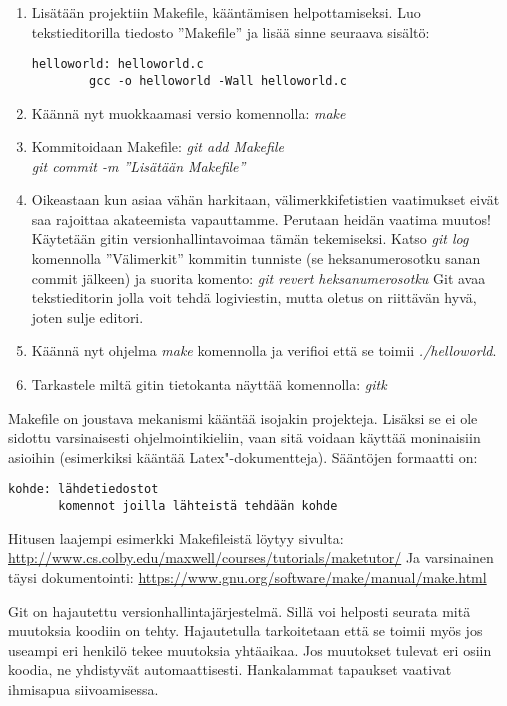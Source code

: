 \documentclass[12pt,portrait,a4]{article}
\begin{document}
\begin{enumerate}
\item Lisätään projektiin Makefile, kääntämisen helpottamiseksi.  Luo
tekstieditorilla tiedosto ''Makefile'' ja lisää sinne seuraava sisältö:
\begin{verbatim}
helloworld: helloworld.c
        gcc -o helloworld -Wall helloworld.c
\end{verbatim}
\item Käännä nyt muokkaamasi versio komennolla: \emph{make}

\item Kommitoidaan Makefile: \emph{git add Makefile}\\
\emph{git commit -m ''Lisätään Makefile''}

\item Oikeastaan kun asiaa vähän harkitaan, välimerkkifetistien vaatimukset
eivät saa rajoittaa akateemista vapauttamme.  Perutaan heidän vaatima
muutos!  Käytetään gitin versionhallintavoimaa tämän tekemiseksi.
Katso \emph{git log} komennolla ''Välimerkit'' kommitin tunniste (se
heksanumerosotku sanan commit jälkeen) ja suorita komento: \emph{git revert
heksanumerosotku}
Git avaa tekstieditorin jolla voit tehdä logiviestin, mutta oletus on
riittävän hyvä, joten sulje editori.
\item Käännä nyt ohjelma \emph{make} komennolla ja verifioi että se toimii
\emph{./helloworld}.

\item Tarkastele miltä gitin tietokanta näyttää komennolla: \emph{gitk}
\end{enumerate}

Makefile on joustava mekanismi kääntää isojakin projekteja.  Lisäksi se
ei ole sidottu varsinaisesti ohjelmointikieliin, vaan sitä voidaan käyttää
moninaisiin asioihin (esimerkiksi kääntää Latex"-dokumentteja).  Sääntöjen
formaatti on:
\begin{verbatim}
kohde: lähdetiedostot
       komennot joilla lähteistä tehdään kohde
\end{verbatim}
Hitusen laajempi esimerkki Makefileistä löytyy sivulta:
\url{http://www.cs.colby.edu/maxwell/courses/tutorials/maketutor/}
Ja varsinainen täysi dokumentointi:
\url{https://www.gnu.org/software/make/manual/make.html}


Git on hajautettu versionhallintajärjestelmä.  Sillä voi helposti seurata
mitä muutoksia koodiin on tehty.  Hajautetulla tarkoitetaan että se toimii
myös jos useampi eri henkilö tekee muutoksia yhtäaikaa.  Jos muutokset
tulevat eri osiin koodia, ne yhdistyvät automaattisesti.  Hankalammat
tapaukset vaativat ihmisapua siivoamisessa.
\end{document}
